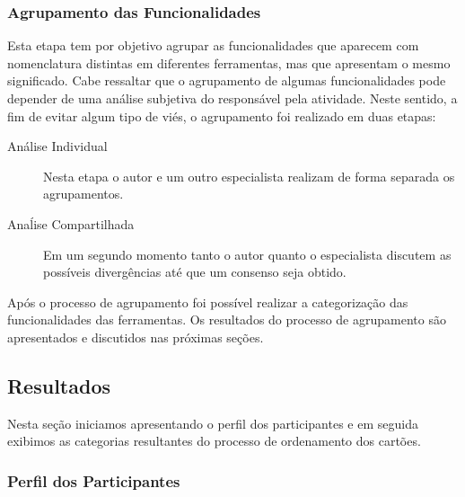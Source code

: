 \subsubsection{Agrupamento das Funcionalidades}
\label{subsec:agrupamento_fucionalidades}

Esta etapa tem por objetivo agrupar as funcionalidades que aparecem com
nomenclatura distintas em diferentes ferramentas, mas que apresentam o mesmo
significado. Cabe ressaltar que o agrupamento de algumas funcionalidades pode
depender de uma análise subjetiva do responsável pela atividade. Neste sentido,
a fim de evitar algum tipo de viés, o agrupamento foi realizado em duas etapas:

\begin{description}
	\item[Análise Individual] Nesta etapa o autor e um outro especialista
		realizam de forma separada os agrupamentos.
	\item[Anaĺise Compartilhada] Em um segundo momento tanto o autor quanto o
		es\-pe\-ci\-a\-lis\-ta discutem as possíveis divergências até que um
		consenso seja obtido.
\end{description}

Após o processo de agrupamento foi possível realizar a categorização das
funcionalidades das ferramentas. Os resultados do processo de agrupamento são
apresentados e discutidos nas próximas seções.

\subsection{Resultados}
\label{sec:resultados}

Nesta seção iniciamos apresentando o perfil dos participantes e em seguida
exibimos as categorias resultantes do processo de ordenamento dos cartões.

\subsubsection{Perfil dos Participantes}
\label{ssub:perfil_participantes}

